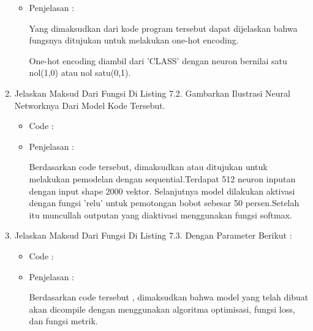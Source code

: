 \begin{enumerate}
\begin{itemize}
\item Penjelasan : 
\par Yang dimaksudkan dari kode program tersebut dapat dijelaskan bahwa fungsnya ditujukan untuk melakukan one-hot encoding.
\par One-hot encoding diambil dari 'CLASS'  dengan neuron bernilai satu nol(1,0) atau nol satu(0,1).
\par
\par
\par
\end{itemize}
\par
\par
\item Jelaskan Maksud Dari Fungsi Di Listing 7.2. Gambarkan Ilustrasi Neural Networknya Dari Model Kode Tersebut.
\begin{itemize}
\item Code :

\item Penjelasan : 
\par Berdasarkan code tersebut, dimaksudkan atau ditujukan untuk melakukan pemodelan dengan sequential.Terdapat 512 neuron inputan dengan input shape 2000 vektor. Selanjutnya model dilakukan aktivasi dengan fungsi 'relu' untuk pemotongan bobot  sebesar 50 persen.Setelah itu muncullah outputan yang diaktivasi menggunakan fungsi softmax.
\par
\par
\end{itemize}
\par
\par
\par
\par
\item Jelaskan Maksud Dari Fungsi Di Listing 7.3. Dengan Parameter Berikut :
\begin{itemize}
\item Code :

\item Penjelasan : 
\par Berdasarkan code tersebut , dimaksudkan bahwa model yang telah dibuat akan dicompile dengan menggunakan algoritma optimisasi, fungsi loss, dan fungsi metrik.
\par
\par
\end{itemize}
\par
\par

\end{enumerate}
